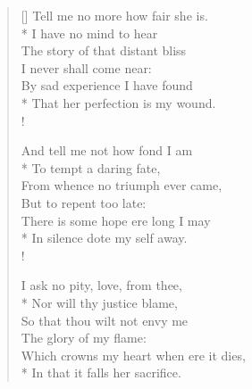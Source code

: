 \documentclass[MAIN]{subfiles}
\begin{document}
\settowidth{\versewidth}{Which crowns my heart when ere it dies,}
\begin{verse}[\versewidth]
Tell me no more how fair she is.\\*
\vin I have no mind to hear\\
The story of that distant bliss\\
\vin I never shall come near:\\
By sad experience I have found\\*
That her perfection is my wound.\\!

And tell me not how fond I am\\*
\vin To tempt a daring fate,\\
From whence no triumph ever came,\\
\vin But to repent too late:\\
There is some hope ere long I may\\*
In silence dote my self away.\\!

I ask no pity, love, from thee,\\*
\vin Nor will thy justice blame,\\
So that thou wilt not envy me\\
\vin The glory of my flame:\\
Which crowns my heart when ere it dies,\\*
In that it falls her sacrifice.
\end{verse}
\end{document}
